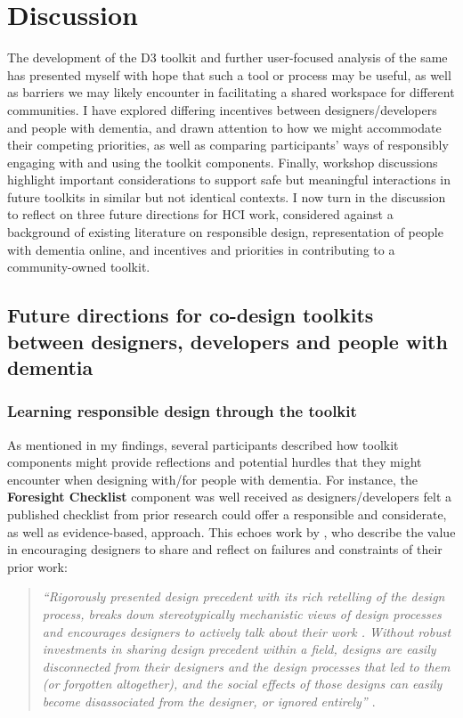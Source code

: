 \section{Discussion}
\label{D3:Discussion}
The development of the D3 toolkit and further user-focused analysis of the same has presented myself with hope that such a tool or process may be useful, as well as barriers we may likely encounter in facilitating a shared workspace for different communities. I have explored differing incentives between designers/developers and people with dementia, and drawn attention to how we might accommodate their competing priorities, as well as comparing participants’ ways of responsibly engaging with and using the toolkit components. Finally, workshop discussions highlight important considerations to support safe but meaningful interactions in future toolkits in similar but not identical contexts. I now turn in the discussion to reflect on three future directions for HCI work, considered against a background of existing literature on responsible design, representation of people with dementia online, and incentives and priorities in contributing to a community-owned toolkit.

\subsection{Future directions for co-design toolkits between designers, developers and people with dementia}

\subsubsection{Learning responsible design through the toolkit}
As mentioned in my findings, several participants described how toolkit components might provide reflections and potential hurdles that they might encounter when designing with/for people with dementia. For instance, the \textbf{Foresight Checklist} component was well received as designers/developers felt a published checklist from prior research could offer a responsible and considerate, as well as evidence-based, approach. This echoes work by \cite{gray2016inscribing}, who describe the value in encouraging designers to share and reflect on failures and constraints of their prior work:

\begin{quote}
    
\textit{``Rigorously presented design precedent with its rich retelling of the design process, breaks down stereotypically mechanistic views of design processes and encourages designers to actively talk about their work \citep{boling2015designerly,smith2010producing}. Without robust investments in sharing design precedent within a field, designs are easily disconnected from their designers and the design processes that led to them (or forgotten altogether), and the social effects of those designs can easily become disassociated from the designer, or ignored entirely'' \citep[p.993]{gray2016inscribing}}.
\end{quote}

